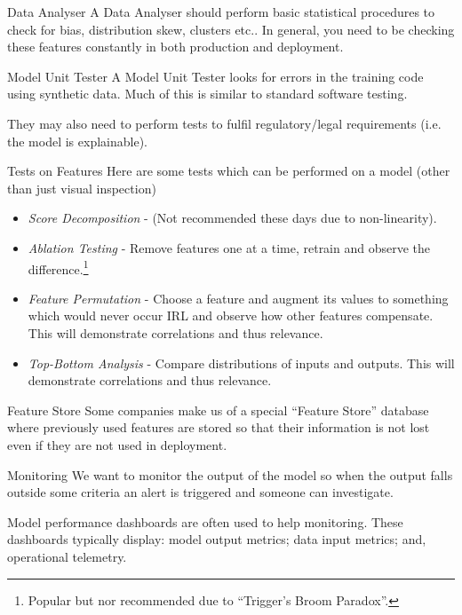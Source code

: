 \documentclass[11pt,a4paper]{article}
\begin{document}
  \begin{proposition}{Data Analyser}
    A Data Analyser should perform basic statistical procedures to check for bias, distribution skew, clusters etc.. In general, you need to be checking these features constantly in both production and deployment.
  \end{proposition}

  \begin{proposition}{Model Unit Tester}
    A Model Unit Tester looks for errors in the training code using synthetic data. Much of this is similar to standard software testing.
    \par They may also need to perform tests to fulfil regulatory/legal requirements (i.e. the model is explainable).
  \end{proposition}

  \begin{proposition}{Tests on Features}
    Here are some tests which can be performed on a model (other than just visual inspection)
    \begin{itemize}
      \item \textit{Score Decomposition} - (Not recommended these days due to non-linearity).
      \item \textit{Ablation Testing} - Remove features one at a time, retrain and observe the difference.\footnote{Popular but nor recommended due to ``Trigger's Broom Paradox''.}
      \item \textit{Feature Permutation} - Choose a feature and augment its values to something which would never occur IRL and observe how other features compensate. This will demonstrate correlations and thus relevance.
      \item \textit{Top-Bottom Analysis} - Compare distributions of inputs and outputs. This will demonstrate correlations and thus relevance.
    \end{itemize}
  \end{proposition}

  \begin{remark}{Feature Store}
    Some companies make us of a special ``Feature Store'' database where previously used features are stored so that their information is not lost even if they are not used in deployment.
  \end{remark}

  \begin{proposition}{Monitoring}
    We want to monitor the output of the model so when the output falls outside some criteria an alert is triggered and someone can investigate.
    \par Model performance dashboards are often used to help monitoring. These dashboards typically display: model output metrics; data input metrics; and, operational telemetry.
  \end{proposition}
\end{document}
